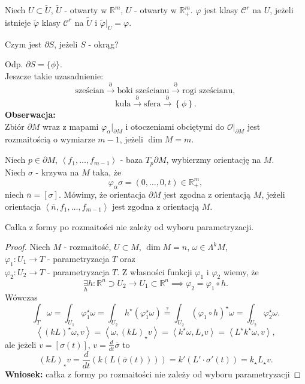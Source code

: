 \documentclass[../main.tex]{subfiles}
\begin{document}
\begin{definicja}
    Niech $U\subset \tilde U$, $\tilde U$ - otwarty w $\mathbb{R}^m$, $U$ - otwarty w $\mathbb{R}^m_+$. $\varphi$ jest klasy $\mathcal{C}^r$ na $U$, jeżeli istnieje $\tilde \varphi$ klasy $\mathcal{C}^r$ na $\tilde U$ i $\tilde \varphi|_U = \varphi$.
\end{definicja}
\begin{pytanie}
    Czym jest $\partial S$, jeżeli $S$ - okrąg?
\end{pytanie}
Odp. $\partial S = \{\phi\}$.\\
Jeszcze takie uzasadnienie:
\[
    \text{sześcian} \overset{\partial}{\to} \text{boki sześcianu} \overset{\partial}{\to} \text{rogi sześcianu}
,\]
\[
    \text{kula} \overset{\partial}{\to} \text{sfera} \overset{\partial}{\to} \left\{ \phi \right\}
.\]
\textbf{Obserwacja:}\\
Zbiór $\partial M$ wraz z mapami $\varphi_\alpha|_{\partial M}$ i otoczeniami obciętymi do $\mathcal{O}|_{\partial M}$ jest rozmaitością o wymiarze $m-1$, jeżeli $\dim M = m$.\\

\pagebreak
\begin{definicja}
Niech  $p\in \partial M$, $\left<f_1,\ldots,f_{m-1} \right>$ - baza $ T_p\partial M$, wybierzmy orientację na $M$.\\
Niech $\sigma$ - krzywa na $M$ taka, że
\[
    \varphi_\alpha\sigma =  \left( 0,\ldots,0,t \right) \in\mathbb{R}^m_+
,\]
niech $\overline{n} = \left[ \sigma \right] $. Mówimy, że orientacja $\partial M$ jest zgodna z orientacją $M$, jeżeli orientacja $\left<\overline{n}, f_1,\ldots,f_{m-1} \right>$ jest zgodna z orientacją $M$.
\end{definicja}

\begin{stw}
    Całka z formy po rozmaitości nie zależy od wyboru parametryzacji.
\end{stw}
\begin{proof}
Niech $M$ - rozmaitość, $U\subset M$, $\dim M = n$, $\omega\in \Lambda^kM$,\\
    $\varphi_1: U_1\to T$ - parametryzacja $T$ oraz \\
    $\varphi_2: U_2\to T$ - parametryzacja $T$. Z własności funkcji  $\varphi_1$ i $\varphi_2$ wiemy, że
\[
\underset{h}{\exists} h: \mathbb{R}^n \supset U_2\to U_1\subset\mathbb{R}^n \implies \varphi_2 = \varphi_1\circ h
.\]
Wówczas
\[
    \int_{T}\omega = \int_{U_1}\varphi_1^\star \omega = \int_{U_2}h^\star\left( \varphi_1^\star\omega \right) \overset{\text{?}}{=} \int_{U_2}(\varphi_1\circ h)^\star\omega = \int_{U_2}\varphi_2^\star\omega
.\]
    \[
        \left<(kL)^\star\omega, v \right> = \left<\omega, (kL)_\star v \right> = \left<k^\star \omega, L_\star v \right> = \left<L^\star k^\star \omega, v \right>
    ,\]
ale jeżeli $v = \left[ \sigma(t) \right]$, $v = \frac{d}{dt}\overline{\sigma}$ to
\[
    (kL)_\star v = \frac{d}{dt}\left( k\left( L\left( \overline{\sigma}(t) \right)  \right)  \right) = k'(L'\cdot \sigma'(t)) = k_\star L_\star v
.\]
\textbf{Wniosek:} całka z formy po rozmaitości nie zależy od wyboru parametryzacji
\end{proof}
\end{document}
